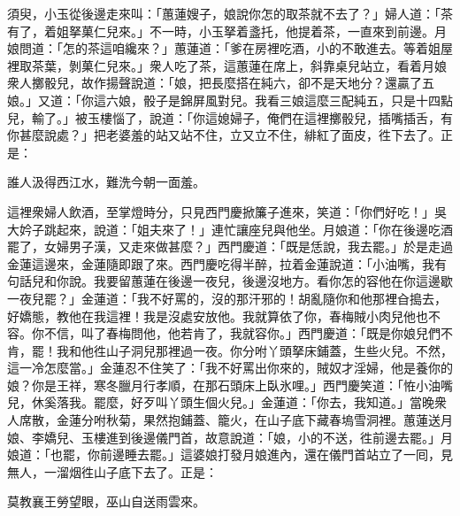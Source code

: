 須臾，小玉從後邊走來叫：「蕙蓮嫂子，娘說你怎的取茶就不去了？」婦人道：「茶有了，着姐拏菓仁兒來。」不一時，小玉拏着盞托，他提着茶，一直來到前邊。月娘問道：「怎的茶這咱纔來？」蕙蓮道：「爹在房裡吃酒，小的不敢進去。{}等着姐屋裡取茶葉，剝菓仁兒來。」衆人吃了茶，這蕙蓮在席上，斜靠桌兒站立，看着月娘衆人擲骰兒，故作揚聲說道：「娘，把長麼搭在純六，卻不是天地分？還贏了五娘。」又道：「你這六娘，骰子是錦屏風對兒。我看三娘這麼三配純五，只是十四點兒，輸了。」被玉樓惱了，說道：「你這媳婦子，俺們在這裡擲骰兒，插嘴插舌，有你甚麼說處？」把老婆羞的站又站不住，立又立不住，緋紅了面皮，徃下去了。{}正是：

誰人汲得西江水，難洗今朝一面羞。

這裡衆婦人飲酒，至掌燈時分，只見西門慶掀簾子進來，笑道：「你們好吃！」吳大妗子跳起來，說道：「姐夫來了！」連忙讓座兒與他坐。月娘道：「你在後邊吃酒罷了，女婦男子漢，又走來做甚麼？」西門慶道：「既是恁說，我去罷。」於是走過金蓮這邊來，金蓮隨即跟了來。西門慶吃得半醉，拉着金蓮說道：「小油嘴，我有句話兒和你說。我要留蕙蓮在後邊一夜兒，後邊沒地方。看你怎的容他在你這邊歇一夜兒罷？」金蓮道：「我不好罵的，沒的那汗邪的！胡亂隨你和他那裡㒲搗去，好嬌態，教他在我這裡！我是沒處安放他。我就算依了你，春梅賊小肉兒他也不容。{}你不信，叫了春梅問他，他若肯了，我就容你。」西門慶道：「既是你娘兒們不肯，罷！我和他徃山子洞兒那裡過一夜。你分咐丫頭拏床鋪蓋，生些火兒。不然，這一冷怎麼當。」金蓮忍不住笑了：「我不好罵出你來的，賊奴才淫婦，他是養你的娘？你是王祥，寒冬臘月行孝順，在那石頭床上臥氷哩。」{}西門慶笑道：「恠小油嘴兒，休奚落我。罷麼，好歹叫丫頭生個火兒。」金蓮道：「你去，我知道。」當晚衆人席散，金蓮分咐秋菊，果然抱鋪蓋、籠火，在山子底下藏春塢雪洞裡。蕙蓮送月娘、李嬌兒、玉樓進到後邊儀門首，故意說道：「娘，小的不送，徃前邊去罷。」月娘道：「也罷，你前邊睡去罷。」這婆娘打發月娘進內，還在儀門首站立了一囘，見無人，{}一溜烟徃山子底下去了。正是：

莫教襄王勞望眼，巫山自送雨雲來。

